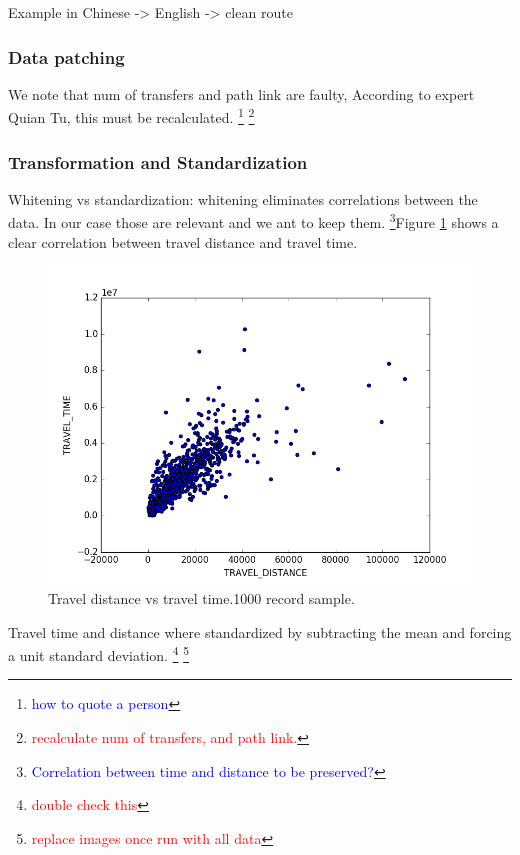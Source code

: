 \documentclass{article}
\newcommand{\selfnote}[1]{\footnote{\textcolor{red}{#1}}}
\newcommand{\technicalDoubt}[1]{\footnote{\textcolor{blue}{#1}}}
\begin{document}
Example in Chinese -> English -> clean route



\subsubsection{Data patching}
We note that num of transfers and path link are faulty, According to expert Quian Tu, this must be recalculated. \technicalDoubt{how to quote a person}
\selfnote{recalculate num of transfers, and path link.}


\subsubsection{Transformation and Standardization}
Whitening vs standardization: whitening eliminates correlations between the data. In our case those are relevant and we ant to keep them. \technicalDoubt{Correlation between time and distance to be preserved?}Figure \ref{fig:preprocessing/distance_time_correlation} shows a clear correlation between travel distance and travel time. 

\begin{figure}
  \centering
  \includegraphics[width=.8\linewidth]{./images/distance_vs_time.png}
  \caption{Travel distance vs travel time.1000 record sample.}
  \label{fig:preprocessing/distance_time_correlation}
\end{figure}

Travel time and distance where standardized by subtracting the mean and forcing a unit standard deviation. \selfnote{double check this} \selfnote{replace images once run with all data}
\end{document}
